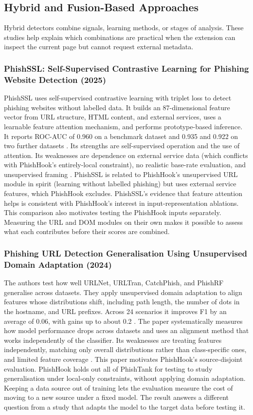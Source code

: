 \documentclass{FastFyp}
\begin{document}
\subsection{Hybrid and Fusion-Based Approaches}
Hybrid detectors combine signals, learning methods, or stages of analysis. These studies help explain which combinations are practical when the extension can inspect the current page but cannot request external metadata.

\subsubsection{PhishSSL: Self-Supervised Contrastive Learning for Phishing Website Detection (2025)}
PhishSSL uses self-supervised contrastive learning with triplet loss to detect phishing websites without labelled data. It builds an 87-dimensional feature vector from URL structure, HTML content, and external services, uses a learnable feature attention mechanism, and performs prototype-based inference. It reports ROC-AUC of 0.960 on a benchmark dataset and 0.935 and 0.922 on two further datasets \cite{phishssl2025}. Its strengths are self-supervised operation and the use of attention. Its weaknesses are dependence on external service data (which conflicts with PhishHook's entirely-local constraint), no realistic base-rate evaluation, and unsupervised framing \cite{phishssl2025}. PhishSSL is related to PhishHook's unsupervised URL module in spirit (learning without labelled phishing) but uses external service features, which PhishHook excludes. PhishSSL's evidence that feature attention helps is consistent with PhishHook's interest in input-representation ablations. This comparison also motivates testing the PhishHook inputs separately. Measuring the URL and DOM modules on their own makes it possible to assess what each contributes before their scores are combined.

\subsubsection{Phishing URL Detection Generalisation Using Unsupervised Domain Adaptation (2024)}
The authors test how well URLNet, URLTran, CatchPhish, and PhishRF generalise across datasets. They apply unsupervised domain adaptation to align features whose distributions shift, including path length, the number of dots in the hostname, and URL prefixes. Across 24 scenarios it improves F1 by an average of 0.06, with gains up to about 0.2 \cite{uda2024}. The paper systematically measures how model performance drops across datasets and uses an alignment method that works independently of the classifier. Its weaknesses are treating features independently, matching only overall distributions rather than class-specific ones, and limited feature coverage \cite{uda2024}. This paper motivates PhishHook's source-disjoint evaluation. PhishHook holds out all of PhishTank for testing to study generalisation under local-only constraints, without applying domain adaptation. Keeping a data source out of training lets the evaluation measure the cost of moving to a new source under a fixed model. The result answers a different question from a study that adapts the model to the target data before testing it.
\end{document}
